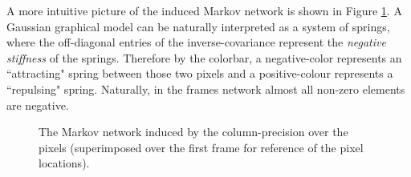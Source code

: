     A more intuitive picture of the induced Markov network is shown in Figure \ref{fig:pixNet_visualisation}.
    A Gaussian graphical model can be {\color{black} naturally} interpreted as a system of springs, where the off-diagonal entries of the inverse-covariance represent the \emph{negative stiffness} of the springs.
    Therefore by the colorbar, a negative-color represents an {\color{black}``attracting"} spring between those two pixels and a positive-colour represents a ``repulsing" spring.
    Naturally, in the frames network almost all non-zero elements are negative.
    
    \begin{figure}[ht]
      \centering
      \caption[The Markov network induced by the column-precision over the pixels.]{ \label{fig:pixNet_visualisation}
	The Markov network induced by the column-precision over the pixels (superimposed over the first frame for reference of the pixel locations).
      }
    \end{figure}
      
